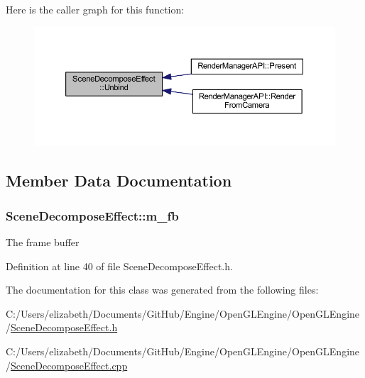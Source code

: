 Here is the caller graph for this function\+:
\nopagebreak
\begin{figure}[H]
\begin{center}
\leavevmode
\includegraphics[width=350pt]{class_scene_decompose_effect_a92108d282bf0f2d7f3b3889ee64cf77c_icgraph}
\end{center}
\end{figure}




\subsection{Member Data Documentation}
\subsubsection[{\texorpdfstring{m\+\_\+fb}{m_fb}}]{ Scene\+Decompose\+Effect\+::m\+\_\+fb\hspace{0.3cm}{\ttfamily [private]}}\hypertarget{class_scene_decompose_effect_a78c46ccb8f4bfd2221c7b69ca80726c9}{}\label{class_scene_decompose_effect_a78c46ccb8f4bfd2221c7b69ca80726c9}


The frame buffer 



Definition at line 40 of file Scene\+Decompose\+Effect.\+h.



The documentation for this class was generated from the following files\+:\begin{DoxyCompactItemize}
\item 
C\+:/\+Users/elizabeth/\+Documents/\+Git\+Hub/\+Engine/\+Open\+G\+L\+Engine/\+Open\+G\+L\+Engine/\hyperlink{_scene_decompose_effect_8h}{Scene\+Decompose\+Effect.\+h}\item 
C\+:/\+Users/elizabeth/\+Documents/\+Git\+Hub/\+Engine/\+Open\+G\+L\+Engine/\+Open\+G\+L\+Engine/\hyperlink{_scene_decompose_effect_8cpp}{Scene\+Decompose\+Effect.\+cpp}\end{DoxyCompactItemize}
